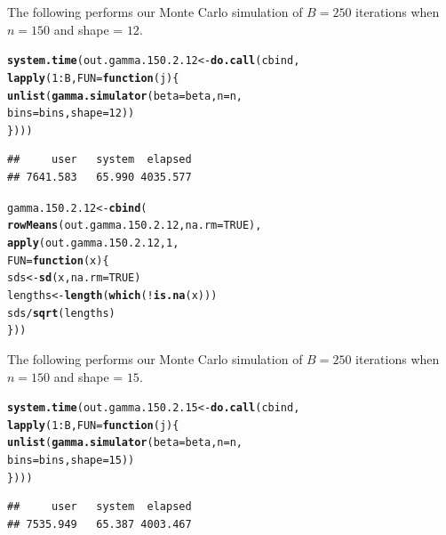 \documentclass[11pt]{article}\usepackage[]{graphicx}\usepackage[]{color}
\makeatletter
\newcommand{\hlnum}[1]{\textcolor[rgb]{0.686,0.059,0.569}{#1}}%
\newcommand{\hlopt}[1]{\textcolor[rgb]{0,0,0}{#1}}%
\newcommand{\hlstd}[1]{\textcolor[rgb]{0.345,0.345,0.345}{#1}}%
\newcommand{\hlkwa}[1]{\textcolor[rgb]{0.161,0.373,0.58}{\textbf{#1}}}%
\newcommand{\hlkwb}[1]{\textcolor[rgb]{0.69,0.353,0.396}{#1}}%
\newcommand{\hlkwc}[1]{\textcolor[rgb]{0.333,0.667,0.333}{#1}}%
\newcommand{\hlkwd}[1]{\textcolor[rgb]{0.737,0.353,0.396}{\textbf{#1}}}%
\newenvironment{kframe}{%
 \def\at@end@of@kframe{}%
 \ifinner\ifhmode%
  \def\at@end@of@kframe{\end{minipage}}%
  \begin{minipage}{\columnwidth}%
 \fi\fi%
 \def\FrameCommand##1{\hskip\@totalleftmargin \hskip-\fboxsep
 \colorbox{shadecolor}{##1}\hskip-\fboxsep
     \hskip-\linewidth \hskip-\@totalleftmargin \hskip\columnwidth}%
 \MakeFramed {\advance\hsize-\width
   \@totalleftmargin\z@ \linewidth\hsize
   \@setminipage}}%
 {\par\unskip\endMakeFramed%
 \at@end@of@kframe}
\newenvironment{knitrout}{}{} %
\makeatother
\begin{document}
The following performs our Monte Carlo simulation of $B = 250$ iterations 
when $n = 150$ and shape = $12$.

\begin{knitrout}
\color{fgcolor}\begin{kframe}
\begin{alltt}
\hlkwd{system.time}\hlstd{(out.gamma.150.2.12} \hlkwb{<-} \hlkwd{do.call}\hlstd{(cbind,}
  \hlkwd{lapply}\hlstd{(}\hlnum{1}\hlopt{:}\hlstd{B,} \hlkwc{FUN} \hlstd{=} \hlkwa{function}\hlstd{(}\hlkwc{j}\hlstd{)\{}
    \hlkwd{unlist}\hlstd{(}\hlkwd{gamma.simulator}\hlstd{(}\hlkwc{beta} \hlstd{= beta,} \hlkwc{n} \hlstd{= n,}
      \hlkwc{bins} \hlstd{= bins,} \hlkwc{shape} \hlstd{=} \hlnum{12}\hlstd{))}
\hlstd{\})))}
\end{alltt}
\begin{verbatim}
##     user   system  elapsed 
## 7641.583   65.990 4035.577
\end{verbatim}
\end{kframe}
\end{knitrout}

\begin{knitrout}
\color{fgcolor}\begin{kframe}
\begin{alltt}
\hlstd{gamma.150.2.12} \hlkwb{<-} \hlkwd{cbind}\hlstd{(}
  \hlkwd{rowMeans}\hlstd{(out.gamma.150.2.12,} \hlkwc{na.rm} \hlstd{=} \hlnum{TRUE}\hlstd{),}
  \hlkwd{apply}\hlstd{(out.gamma.150.2.12,} \hlnum{1}\hlstd{,}
  \hlkwc{FUN} \hlstd{=} \hlkwa{function}\hlstd{(}\hlkwc{x}\hlstd{)\{}
    \hlstd{sds} \hlkwb{<-} \hlkwd{sd}\hlstd{(x,} \hlkwc{na.rm} \hlstd{=} \hlnum{TRUE}\hlstd{)}
    \hlstd{lengths} \hlkwb{<-} \hlkwd{length}\hlstd{(}\hlkwd{which}\hlstd{(}\hlopt{!}\hlkwd{is.na}\hlstd{(x)))}
    \hlstd{sds} \hlopt{/} \hlkwd{sqrt}\hlstd{(lengths)}
  \hlstd{\}))}
\end{alltt}
\end{kframe}
\end{knitrout}

The following performs our Monte Carlo simulation of $B = 250$ iterations 
when $n = 150$ and shape = $15$.

\begin{knitrout}
\color{fgcolor}\begin{kframe}
\begin{alltt}
\hlkwd{system.time}\hlstd{(out.gamma.150.2.15} \hlkwb{<-} \hlkwd{do.call}\hlstd{(cbind,}
  \hlkwd{lapply}\hlstd{(}\hlnum{1}\hlopt{:}\hlstd{B,} \hlkwc{FUN} \hlstd{=} \hlkwa{function}\hlstd{(}\hlkwc{j}\hlstd{)\{}
    \hlkwd{unlist}\hlstd{(}\hlkwd{gamma.simulator}\hlstd{(}\hlkwc{beta} \hlstd{= beta,} \hlkwc{n} \hlstd{= n,}
      \hlkwc{bins} \hlstd{= bins,} \hlkwc{shape} \hlstd{=} \hlnum{15}\hlstd{))}
\hlstd{\})))}
\end{alltt}
\begin{verbatim}
##     user   system  elapsed 
## 7535.949   65.387 4003.467
\end{verbatim}
\end{kframe}
\end{knitrout}
\end{document}
